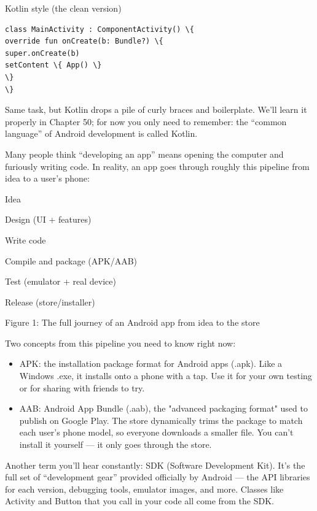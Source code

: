Kotlin style (the clean version)

\begin{lstlisting}
class MainActivity : ComponentActivity() \{
override fun onCreate(b: Bundle?) \{
super.onCreate(b)
setContent \{ App() \}
\}
\}
\end{lstlisting}

Same task, but Kotlin drops a pile of curly braces and boilerplate. We'll learn it properly in Chapter 50; for now you only need to remember: the “common language” of Android development is called Kotlin.


Many people think “developing an app” means opening the computer and furiously writing code. In reality, an app goes through roughly this pipeline from idea to a user's phone:

Idea

Design (UI + features)

Write code

Compile and package (APK/AAB)

Test (emulator + real device)

Release (store/installer)

\begin{center}\small\color{gray}Figure 1: The full journey of an Android app from idea to the store\end{center}

Two concepts from this pipeline you need to know right now:

\begin{itemize}
  \item APK: the installation package format for Android apps (.apk). Like a Windows .exe, it installs onto a phone with a tap. Use it for your own testing or for sharing with friends to try.
  \item AAB: Android App Bundle (.aab), the "advanced packaging format" used to publish on Google Play. The store dynamically trims the package to match each user's phone model, so everyone downloads a smaller file. You can't install it yourself — it only goes through the store.
\end{itemize}

Another term you'll hear constantly: SDK (Software Development Kit). It's the full set of “development gear” provided officially by Android — the API libraries for each version, debugging tools, emulator images, and more. Classes like Activity and Button that you call in your code all come from the SDK.

